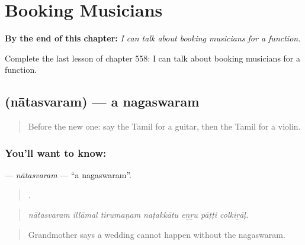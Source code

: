 
\chapter{Booking Musicians}
\label{ch:ta-booking-musicians}

\begin{chapteropening}
\textbf{By the end of this chapter:} \emph{I can talk about booking musicians for a function.}

Complete the last lesson of chapter 558: I can talk about booking musicians for a function.
\end{chapteropening}

\section[\texorpdfstring{\ta{நாதஸ்வரம்} (nātasvaram)}{நாதஸ்வரம் (nātasvaram)}]{ (nātasvaram) — a nagaswaram}

\label{lesson:TA-C558-natasvaram}



\begin{quote}
Before the new one: say the Tamil for a guitar, then the Tamil for a violin.
\end{quote}

\subsection*{You'll want to know: }
\textbf{} — \emph{nātasvaram} — \textquotedblleft{}a nagaswaram\textquotedblright{}.

\begin{quote}
      .
\end{quote}

\begin{quote}
\emph{nātasvaram illāmal tirumaṇam naṭakkātu eṉṟu pāṭṭi colkiṟāḷ.}
\end{quote}

\begin{quote}
Grandmother says a wedding cannot happen without the nagaswaram.
\end{quote}

